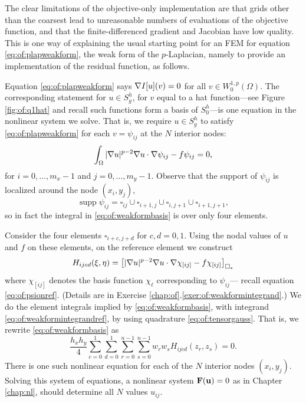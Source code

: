 The clear limitations of the objective-only implementation are that grids other than the coarsest lead to unreasonable numbers of evaluations of the objective function, and that the finite-differenced gradient and Jacobian have low quality.  This is one way of explaining the usual starting point for an FEM for equation \eqref{eq:of:plapweakform}, the weak form of the $p$-Laplacian, namely to provide an implementation of the residual function, as follows.

Equation \eqref{eq:of:plapweakform} says $\nabla I[u](v) = 0$ for all $v\in W_0^{1,p}(\Omega)$.  The corresponding statement for $u\in S_g^h$, for $v$ equal to a hat function---see Figure \ref{fig:of:q1hat} and recall such functions form a basis of $S_0^h$---is one equation in the nonlinear system we solve.  That is, we require $u\in S_g^h$ to satisfy \eqref{eq:of:plapweakform} for each $v=\psi_{ij}$ at the $N$ interior nodes:
\begin{equation}
\int_\Omega |\nabla u|^{p-2} \nabla u \cdot \nabla \psi_{ij} - f \psi_{ij} = 0, \label{eq:of:weakformbasis}
\end{equation}
for $i=0,\dots,m_x-1$ and $j=0,\dots,m_y-1$.  Observe that the support of $\psi_{ij}$ is localized around the node $(x_i,y_j)$,
    $$\operatorname{supp} \psi_{ij} = \square_{ij} \cup \square_{i+1,j} \cup \square_{i,j+1} \cup \square_{i+1,j+1},$$
so in fact the integral in \eqref{eq:of:weakformbasis} is over only four elements.


Consider the four elements $\square_{i+c,j+d}$ for $c,d=0,1$.  Using the nodal values of $u$ and $f$ on these elements, on the reference element we construct
\begin{equation}
H_{ijcd}(\xi,\eta) = \left[|\nabla u|^{p-2} \nabla u \cdot \nabla \chi_{[ij]} - f \chi_{[ij]}\right]_{\square_\ast} \label{eq:of:weakformintegrandref}
\end{equation}
where $\chi_{[ij]}$ denotes the basis function $\chi_\ell$ corresponding to $\psi_{ij}$--- recall equation \eqref{eq:of:psionref}. (Details are in Exercise \ref{chap:of}.\ref{exer:of:weakformintegrand}.)  We do the element integrals implied by \eqref{eq:of:weakformbasis}, with integrand \eqref{eq:of:weakformintegrandref}, by using quadrature \eqref{eq:of:tensorgauss}.  That is, we rewrite \eqref{eq:of:weakformbasis} as
\begin{equation}
\frac{h_x h_y}{4} \sum_{c=0}^1 \sum_{d=0}^1 \sum_{r=0}^{n-1} \sum_{s=0}^{n-1} w_r w_s H_{ijcd}(z_r,z_s) = 0.  \label{eq:of:weakformdetail}
\end{equation}
There is one such nonlinear equation for each of the $N$ interior nodes $(x_i,y_j)$.  Solving this system of equations, a nonlinear system $\mathbf{F}(\mathbf{u})=0$ as in Chapter \ref{chap:nl}, should determine all $N$ values $u_{ij}$.

